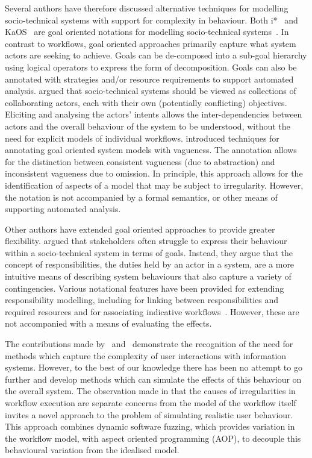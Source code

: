 \documentclass{llncs}
\begin{document}
Several authors have therefore discussed alternative techniques for modelling socio-technical systems with
support for complexity in behaviour.  Both i*~\citep{yu1995social} and KaOS~\citep{dardenne93goal} are goal oriented notations for modelling socio-technical
systems~\cite{werneck2009goreistarkaos}.  In contrast to workflows, goal oriented approaches primarily capture what
system actors are seeking to achieve.  Goals can be de-composed into a sub-goal hierarchy using logical operators to
express the form of decomposition. Goals can also be annotated with strategies and/or resource requirements to support
automated analysis.  \citet{yu1995social} argued that socio-technical systems should be viewed as collections of
collaborating actors, each with their own (potentially conflicting) objectives.  Eliciting and analysing the actors'
intents allows the inter-dependencies between actors and the overall behaviour of the system to be understood, without
the need for explicit models of individual workflows. \citet{herrmann1999vagueness} introduced techniques for annotating
goal oriented system models with vagueness.  The annotation allows for the distinction between consistent vagueness (due
to abstraction) and inconsistent vagueness due to omission.  In principle, this approach allows for the identification
of aspects of a model that may be subject to irregularity.  However, the notation is not accompanied by a formal
semantics, or other means of supporting automated analysis.

Other authors have extended goal oriented approaches to provide greater flexibility. \citet{sommerville09deriving}
argued that stakeholders often struggle to express their behaviour within a socio-technical system in terms of goals.
Instead, they argue that the concept of responsibilities, the duties held by an actor in a system, are a more intuitive
means of describing system behaviours that also capture a variety of contingencies.  Various notational features have
been provided for extending responsibility modelling, including for linking between responsibilities and required
resources and for associating indicative workflows~\citep{dewsbury07responsibility}.  However, these are not accompanied
with a means of evaluating the effects.

The contributions made by~\citet{herrmann1999vagueness} and~\citet{sommerville09deriving} demonstrate the recognition of
the need for methods which capture the complexity of user interactions with information systems.  However, to the best
of our knowledge there has been no attempt to go further and develop methods which can simulate the effects of this
behaviour on the overall system. The observation made in  that the causes of irregularities in
workflow execution are separate concerns from the model of the workflow itself invites a novel approach to the problem
of simulating realistic user behaviour. This approach combines dynamic software fuzzing, which provides variation in the
workflow model, with aspect oriented programming (AOP), to decouple this behavioural variation from the idealised model.
\end{document}
